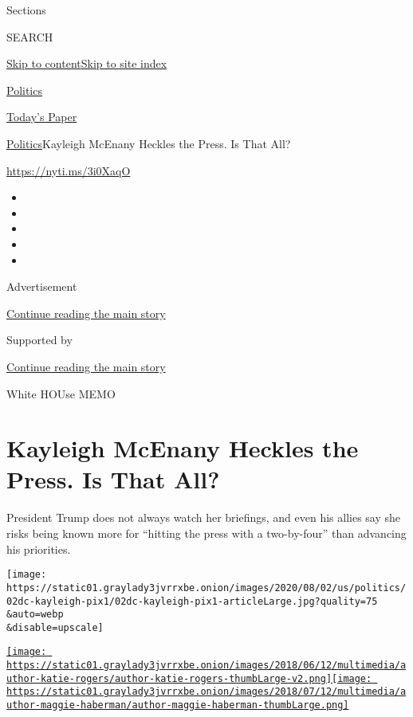Sections

SEARCH

\protect\hyperlink{site-content}{Skip to
content}\protect\hyperlink{site-index}{Skip to site index}

\href{https://www.nytimes3xbfgragh.onion/section/politics}{Politics}

\href{https://myaccount.nytimes3xbfgragh.onion/auth/login?response_type=cookie\&client_id=vi}{}

\href{https://www.nytimes3xbfgragh.onion/section/todayspaper}{Today's
Paper}

\href{/section/politics}{Politics}\textbar{}Kayleigh McEnany Heckles the
Press. Is That All?

\url{https://nyti.ms/3i0XaqO}

\begin{itemize}
\item
\item
\item
\item
\item
\end{itemize}

Advertisement

\protect\hyperlink{after-top}{Continue reading the main story}

Supported by

\protect\hyperlink{after-sponsor}{Continue reading the main story}

White HOUse MEMO

\hypertarget{kayleigh-mcenany-heckles-the-press-is-that-all}{%
\section{Kayleigh McEnany Heckles the Press. Is That
All?}\label{kayleigh-mcenany-heckles-the-press-is-that-all}}

President Trump does not always watch her briefings, and even his allies
say she risks being known more for ``hitting the press with a
two-by-four'' than advancing his priorities.

\texttt{[image: https://static01.graylady3jvrrxbe.onion/images/2020/08/02/us/politics/02dc-kayleigh-pix1/02dc-kayleigh-pix1-articleLarge.jpg?quality=75\\\&auto=webp\\\&disable=upscale]}

\href{https://www.nytimes3xbfgragh.onion/by/katie-rogers}{\texttt{[image: https://static01.graylady3jvrrxbe.onion/images/2018/06/12/multimedia/author-katie-rogers/author-katie-rogers-thumbLarge-v2.png]}}\href{https://www.nytimes3xbfgragh.onion/by/maggie-haberman}{\texttt{[image: https://static01.graylady3jvrrxbe.onion/images/2018/07/12/multimedia/author-maggie-haberman/author-maggie-haberman-thumbLarge.png]}}

